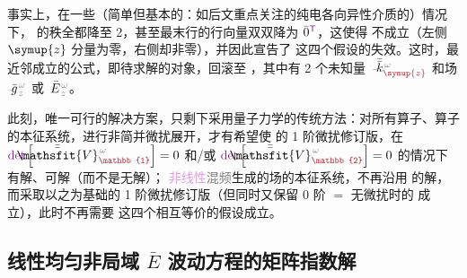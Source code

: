 事实上，在一些（简单但基本的：如后文重点关注的\textcolor{PineGreen}{纯电各向异性}介质的）情况下， 的秩全都降至 2，甚至最末行的行向量双双降为 $\bar{0}^{\mathsf{\textcolor{Plum}{T}}}$，这使得  不成立（左侧 $\symup{z}$ 分量为零，右侧却非零），并因此宣告了  这四个假设的失效。这时，最近邻成立的公式，即待求解的对象，回滚至 ，其中有 2 个未知量 $\Xint{\begin{smallmatrix} ~ \\ {}^{}_{\mathcolor{gray}{-}} \\ ~ \end{smallmatrix}}{15}{\bar{\bar{k}}}_{\textcolor{Maroon}{\symup{z}}}^{\;\! \mathcolor{gray}{\omega}}$ 和场 $\Xint{{}^{}_{\mathcolor{gray}{-}}}{10}{\bar{g}}^{\;\!\mathcolor{gray}{\omega}}_{\;\! \mathcolor{gray}{z}}$ 或 $\Xint{\mathcolor{gray}{-}}{25}{\bar{E}}^{\;\!\mathcolor{gray}{\omega}}_{\;\! \mathcolor{gray}{z}}$。

此刻，唯一可行的解决方案，只剩下采用\textcolor{NavyBlue}{量子力学}的传统方法：对所有算子、算子的\textcolor{PineGreen}{本征系统}，进行\textcolor{NavyBlue}{非简并微扰展开}，才有希望使 {\one}  的 \textcolor{NavyBlue}{1 阶微扰}修订版，在 $\textcolor{Plum}{\det} \left[ \Xint{\mathcolor{gray}{-}}{25}{\bar{\bar{\mathsfit{V}}}}^{\;\! \mathcolor{gray}{\omega}}_{\textcolor{Maroon}{\mathbb{1}}} \right] = 0$ 和/或 $\textcolor{Plum}{\det} \left[ \Xint{\mathcolor{gray}{-}}{25}{\bar{\bar{\mathsfit{V}}}}^{\;\! \mathcolor{gray}{\omega}}_{\textcolor{Maroon}{\mathbb{2}}} \right] = 0$ 的情况下有解、可解（而不是无解）；{\two} \textcolor{Plum}{非线性}\textcolor{gray}{混频}生成的场的\textcolor{PineGreen}{本征系统}，不再沿用  的解，而采取以之为基础的 \textcolor{NavyBlue}{1 阶微扰}修订版（但同时又保留 \textcolor{NavyBlue}{0 阶} $=$ \textcolor{NavyBlue}{无微扰}时的  成立），此时不再需要  这四个相互等价的假设成立。

\clearpage
\vspace*{-7.5em}


\subsection{线性均匀非局域 $\bar{E}$ 波动方程的矩阵指数解}\label{ssec:Exp-solution-linear}

